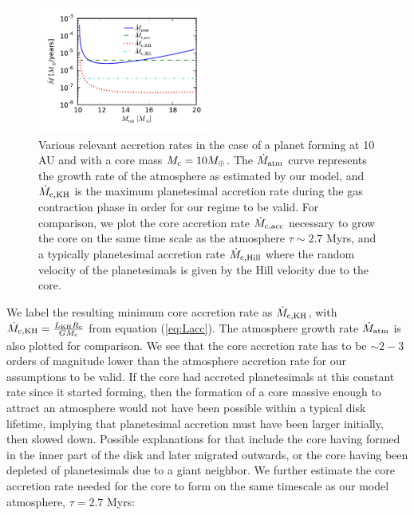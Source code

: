 \documentclass[apj]{emulateapj}
\newcommand{\co}{_{\rm c}}
\begin{document}
 \begin{figure}[h]
\centering
\includegraphics[width=0.5\textwidth]{../../figs/ModelAtmospheres/RadSelfGravPoly/acc_rates_paper.pdf}
\caption{Various relevant accretion rates in the case of a planet forming at 10 AU and with a core mass $M\co=10 M_{\oplus}$. The $\dot{M}_{\rm{atm}}$ curve represents the growth rate of the atmosphere as estimated by our model, and $\dot{M}_{\rm{c,KH}}$ is the maximum planetesimal accretion rate during the gas contraction phase in order for our regime to be valid. For comparison, we plot the core accretion rate $\dot{M}_{\rm{c,acc}}$ necessary to grow the core on the same time scale as the atmosphere $\tau \sim 2.7$ Myrs, and a typically planetesimal accretion rate $\dot{M}_{\rm{c,Hill}}$ where the random velocity of the planetesimals is given by the Hill velocity due to the core.}
\label{fig:accrates}
\end{figure}

We label the resulting minimum core accretion rate as $\dot{M}_{\rm{c,KH}}$, with  $\dot{M}_{\rm{c,KH}}=\frac{L_{\rm{KH}} R\co}{G M\co}$ from equation (\ref{eq:Lacc}). The atmosphere growth rate $\dot{M}_{\rm{atm}}$ is also plotted for comparison. We see that the core accretion rate has to be $\sim2-3$ orders of magnitude lower than the atmosphere accretion rate for our assumptions to be valid.  If the core had accreted planetesimals at this constant rate since it started forming, then the formation of a core massive enough to attract an atmosphere would not have been possible within a typical disk lifetime, implying that planetesimal accretion must have been larger initially, then slowed down. Possible explanations for that include the core having formed in the inner part of the disk and later migrated outwards, or the core having been depleted of planetesimals due to a giant neighbor. We further estimate the core accretion rate needed for the core to form on the same timescale as our model atmosphere, $\tau=2.7$ Myrs:
\end{document}
